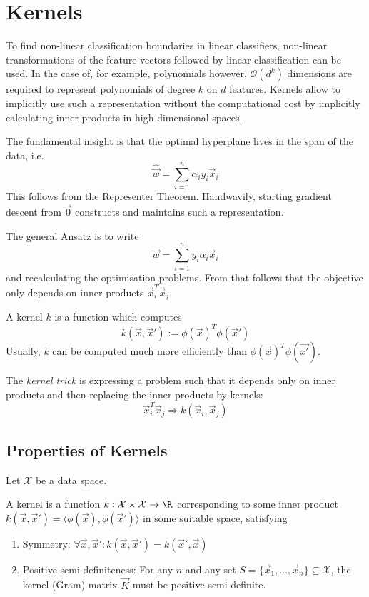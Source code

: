\section{Kernels}
To find non-linear classification boundaries in linear
classifiers, non-linear transformations of the feature vectors
followed by linear classification can be used.
In the case of, for example, polynomials however,
$\mathcal{O}(d^k)$ dimensions are required to represent
polynomials of degree $k$ on $d$ features.
Kernels allow to implicitly use such a representation
without the computational cost by implicitly calculating
inner products in high-dimensional spaces.

The fundamental insight is that the optimal hyperplane
lives in the span of the data, i.e.
\begin{equation*}
    \hat{\vec{w}} = \sum_{i=1}^n{\alpha_i y_i \vec{x}_i}
\end{equation*}
This follows from the Representer Theorem.
Handwavily, starting gradient descent from $\vec{0}$
constructs and maintains such a representation.

The general Ansatz is to write
\begin{equation*}
    \vec{w} = \sum_{i=1}^n{y_i \alpha_i \vec{x}_i}
\end{equation*}
and recalculating the optimisation problems.
From that follows that the objective only depends
on inner products $\vec{x}_i^T \vec{x}_j$.

A kernel $k$ is a function which computes
\begin{equation*}
    k(\vec{x}, \vec{x}') :=
    \phi(\vec{x})^T \phi(\vec{x}')
\end{equation*}
Usually, $k$ can be computed much more efficiently than
$\phi(\vec{x})^T \phi(\vec{x'})$.

The \emph{kernel trick} is expressing a problem such that
it depends only on inner products and then replacing the
inner products by kernels:
\begin{equation*}
    \vec{x}_i^T \vec{x}_j \Rightarrow k(\vec{x}_i, \vec{x}_j)
\end{equation*}


\subsection{Properties of Kernels}
Let $\mathcal{X}$ be a data space.

A kernel is a function
$k : \mathcal{X} \times \mathcal{X} \to \R$
corresponding to some inner product
$k(\vec{x}, \vec{x}') = \langle \phi(\vec{x}), \phi(\vec{x}') \rangle$
in some suitable space,
satisfying
\begin{enumerate}
    \item Symmetry:
    $\forall \vec{x}, \vec{x}': k(\vec{x}, \vec{x}') = k(\vec{x}', \vec{x})$
    \item Positive semi-definiteness:
    For any $n$ and any set $S = \{\vec{x}_1, \dotsc, \vec{x}_n\} \subseteq \mathcal{X}$,
    the kernel (Gram) matrix $\vec{K}$ must be positive
    semi-definite.
\end{enumerate}

